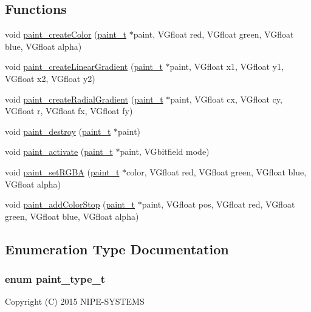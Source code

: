 \subsection*{Functions}
\begin{DoxyCompactItemize}
\item 
void \hyperlink{canvas-paint_8h_ab592ca67fb1837cd3cf544f609b79f64}{paint\+\_\+create\+Color} (\hyperlink{structpaint__t}{paint\+\_\+t} $\ast$paint, V\+Gfloat red, V\+Gfloat green, V\+Gfloat blue, V\+Gfloat alpha)
\item 
void \hyperlink{canvas-paint_8h_ac1598eac12f6ba5d101b2dd09c994600}{paint\+\_\+create\+Linear\+Gradient} (\hyperlink{structpaint__t}{paint\+\_\+t} $\ast$paint, V\+Gfloat x1, V\+Gfloat y1, V\+Gfloat x2, V\+Gfloat y2)
\item 
void \hyperlink{canvas-paint_8h_a79de025c3c5f989806af6ce599084d54}{paint\+\_\+create\+Radial\+Gradient} (\hyperlink{structpaint__t}{paint\+\_\+t} $\ast$paint, V\+Gfloat cx, V\+Gfloat cy, V\+Gfloat r, V\+Gfloat fx, V\+Gfloat fy)
\item 
void \hyperlink{canvas-paint_8h_a430811e2f660a0783c6bf5eff8534b52}{paint\+\_\+destroy} (\hyperlink{structpaint__t}{paint\+\_\+t} $\ast$paint)
\item 
void \hyperlink{canvas-paint_8h_a1743eb90369368d6504e9a7a15a8cd93}{paint\+\_\+activate} (\hyperlink{structpaint__t}{paint\+\_\+t} $\ast$paint, V\+Gbitfield mode)
\item 
void \hyperlink{canvas-paint_8h_a86b4c532b0841780a1d26174a8d9ee2e}{paint\+\_\+set\+R\+G\+B\+A} (\hyperlink{structpaint__t}{paint\+\_\+t} $\ast$color, V\+Gfloat red, V\+Gfloat green, V\+Gfloat blue, V\+Gfloat alpha)
\item 
void \hyperlink{canvas-paint_8h_a7834b6c6483f9832c12d6724f26776f3}{paint\+\_\+add\+Color\+Stop} (\hyperlink{structpaint__t}{paint\+\_\+t} $\ast$paint, V\+Gfloat pos, V\+Gfloat red, V\+Gfloat green, V\+Gfloat blue, V\+Gfloat alpha)
\end{DoxyCompactItemize}


\subsection{Enumeration Type Documentation}
\hypertarget{canvas-paint_8h_a2d52f465c03f4e659488016e2d62633d}{}
\subsubsection[{paint\+\_\+type\+\_\+t}]{\setlength{\rightskip}{0pt plus 5cm}enum {\bf paint\+\_\+type\+\_\+t}}\label{canvas-paint_8h_a2d52f465c03f4e659488016e2d62633d}
Copyright (C) 2015 N\+I\+P\+E-\/\+S\+Y\+S\+T\+E\+M\+S

